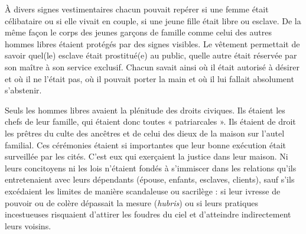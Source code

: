 À divers signes vestimentaires chacun pouvait repérer si une
femme était célibataire ou si elle vivait en couple, si une jeune fille était
libre ou esclave. De la même façon le corps des jeunes garçons de famille
comme celui des autres hommes libres étaient protégés par des signes visibles.
Le vêtement permettait de savoir quel(le) esclave était prostitué(e)
au public, quelle autre était réservée par son maître à son service exclusif.
Chacun savait ainsi où il était autorisé à désirer et où il ne l'était pas, où il
pouvait porter la main et où il lui fallait absolument s'abstenir.

Seuls les hommes libres avaient la plénitude des droits civiques. Ils
étaient les chefs de leur famille, qui étaient donc toutes « patriarcales ».
Ils étaient de droit les prêtres du culte des ancêtres et de celui des dieux
de la maison sur l'autel familial. Ces cérémonies étaient si importantes
que leur bonne exécution était surveillée par les cités. C'est eux qui exerçaient
la justice dans leur maison. Ni leurs concitoyens ni les lois
n'étaient fondés à s'immiscer dans les relations qu'ils entretenaient avec
leurs dépendants (épouse, enfants, esclaves, clients), sauf s'ils excédaient
les limites de manière scandaleuse ou sacrilège : si leur ivresse de pouvoir
ou de colère dépassait la mesure (\emph{hubris}) ou si leurs pratiques incestueuses
risquaient d'attirer les foudres du ciel et d'atteindre indirectement leurs
voisins.

